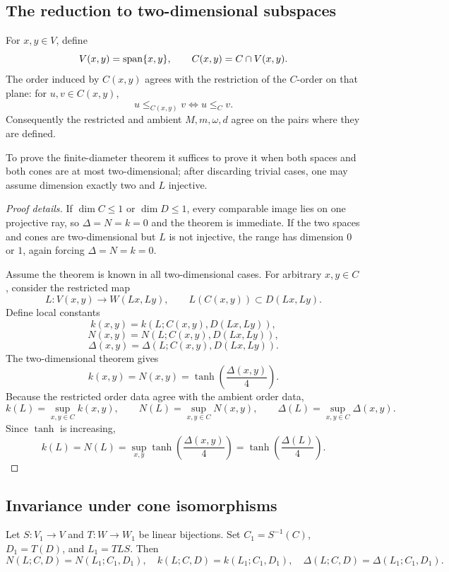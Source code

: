 \subsection{The reduction to two-dimensional subspaces}
For $x,y\in V$, define
\[
  V(x,y)=\operatorname{span}\{x,y\},
  \qquad
  C(x,y)=C\cap V(x,y).
\]
The order induced by $C(x,y)$ agrees with the restriction of the $C$-order on that plane:
for $u,v\in C(x,y)$,
\[
  u\le_{C(x,y)}v \iff u\le_C v.
\]
Consequently the restricted and ambient $M,m,\omega,d$ agree on the pairs where they are defined.

\begin{lemma}
To prove the finite-diameter theorem it suffices to prove it when both spaces and both cones are at most two-dimensional; after discarding trivial cases, one may assume dimension exactly two and $L$ injective.
\end{lemma}

\begin{proof}[Proof details]
If $\dim C\le1$ or $\dim D\le1$, every comparable image lies on one projective ray, so $\Delta=N=k=0$ and the theorem is immediate.
If the two spaces and cones are two-dimensional but $L$ is not injective, the range has dimension $0$ or $1$, again forcing $\Delta=N=k=0$.

Assume the theorem is known in all two-dimensional cases.
For arbitrary $x,y\in C$, consider the restricted map
\[
  L:V(x,y)\to W(Lx,Ly),
  \qquad
  L(C(x,y))\subset D(Lx,Ly).
\]
Define local constants
\[
  k(x,y)=k(L;C(x,y),D(Lx,Ly)),
\]
\[
  N(x,y)=N(L;C(x,y),D(Lx,Ly)),
\]
\[
  \Delta(x,y)=\Delta(L;C(x,y),D(Lx,Ly)).
\]
The two-dimensional theorem gives
\[
  k(x,y)=N(x,y)=\tanh\!\left(\frac{\Delta(x,y)}{4}\right).
\]
Because the restricted order data agree with the ambient order data,
\[
  k(L)=\sup_{x,y\in C} k(x,y),
  \qquad
  N(L)=\sup_{x,y\in C} N(x,y),
  \qquad
  \Delta(L)=\sup_{x,y\in C}\Delta(x,y).
\]
Since $\tanh$ is increasing,
\[
  k(L)=N(L)=\sup_{x,y}\tanh\!\left(\frac{\Delta(x,y)}{4}\right)
       =\tanh\!\left(\frac{\Delta(L)}{4}\right).
\]
\end{proof}

\subsection{Invariance under cone isomorphisms}
\begin{lemma}
Let $S:V_1\to V$ and $T:W\to W_1$ be linear bijections.
Set $C_1=S^{-1}(C)$, $D_1=T(D)$, and $L_1=TLS$.
Then
\[
  N(L;C,D)=N(L_1;C_1,D_1),\quad
  k(L;C,D)=k(L_1;C_1,D_1),\quad
  \Delta(L;C,D)=\Delta(L_1;C_1,D_1).
\]
\end{lemma}

